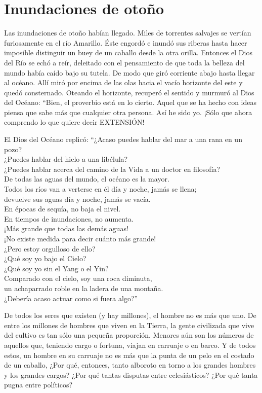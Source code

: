 \documentclass[book,b5paper,hidelinks,final]{memoir}
\begin{document}
	\chapter*{Inundaciones de otoño}
	
	Las inundaciones de otoño habían llegado. Miles de torrentes salvajes se
	vertían furiosamente en el río Amarillo. Éste engordó e inundó sus
	riberas hasta hacer imposible distinguir un buey de un caballo desde la
	otra orilla. Entonces el Dios del Río se echó a reír, deleitado con el
	pensamiento de que toda la belleza del mundo había caído bajo su tutela.
	De modo que giró corriente abajo hasta llegar al océano. Allí miró por
	encima de las olas hacia el vacío horizonte del este y quedó
	consternado. Oteando el horizonte, recuperó el sentido y murmuró al Dios
	del Océano: ``Bien, el proverbio está en lo cierto. Aquel que se ha
	hecho con ideas piensa que sabe más que cualquier otra persona. Así he
	sido yo. ¡Sólo que ahora comprendo lo que quiere decir EXTENSIÓN!
	
	El Dios del Océano replicó: ``¿Acaso puedes hablar del mar a una rana en
	un pozo?\\
	¿Puedes hablar del hielo a una libélula?\\
	¿Puedes hablar acerca del camino de la Vida a un doctor en filosofía?\\
	De todas las aguas del mundo, el océano es la mayor.\\
	Todos los ríos van a verterse en él día y noche, jamás se llena;\\
	devuelve sus aguas día y noche, jamás se vacía.\\
	En épocas de sequía, no baja el nivel.\\
	En tiempos de inundaciones, no aumenta.\\
	¡Más grande que todas las demás aguas!\\
	¡No existe medida para decir cuánto más grande!\\
	¿Pero estoy orgulloso de ello?\\
	¿Qué soy yo bajo el Cielo?\\
	¿Qué soy yo sin el Yang o el Yin?\\
	Comparado con el cielo, soy una roca diminuta,\\
	un achaparrado roble en la ladera de una montaña.\\
	¿Debería acaso actuar como si fuera algo?''
	
	De todos los seres que existen (y hay millones), el hombre no es más que
	uno. De entre los millones de hombres que viven en la Tierra, la gente
	civilizada que vive del cultivo es tan sólo una pequeña proporción.
	Menores aún son los números de aquellos que, teniendo cargo o fortuna,
	viajan en carruaje o en barco. Y de todos estos, un hombre en su
	carruaje no es más que la punta de un pelo en el costado de un caballo,
	¿Por qué, entonces, tanto alboroto en torno a los grandes hombres y los
	grandes cargos? ¿Por qué tantas disputas entre eclesiásticos? ¿Por qué
	tanta pugna entre políticos?
	
\end{document}

